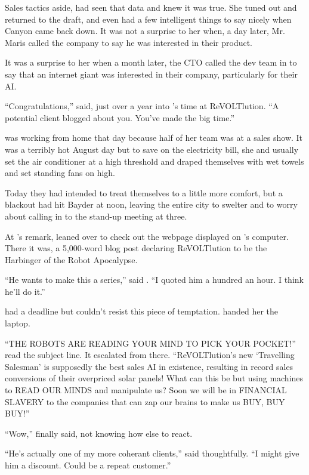 Sales tactics aside, {\protag} had seen that data and knew it was true. She tuned out and returned to the draft, and even had a few intelligent things to say nicely when Canyon came back down. It was not a surprise to her when, a day later, Mr. Maris called the company to say he was interested in their product.

It was a surprise to her when a month later, the CTO called the dev team in to say that an internet giant was interested in their company, particularly for their AI.

\vspace{5mm}

``Congratulations,'' {\sidetag} said, just over a year into {\protag}’s time at ReVOLTlution. ``A potential client blogged about you. You've made the big time.''

{\protag} was working from home that day because half of her team was at a sales show. It was a terribly hot August day but to save on the electricity bill, she and {\sidetag} usually set the air conditioner at a high threshold and draped themselves with wet towels and set standing fans on high.

Today they had intended to treat themselves to a little more comfort, but a blackout had hit Bayder at noon, leaving the entire city to swelter and {\protag} to worry about calling in to the stand-up meeting at three.

At {\sidetag}'s remark, {\protag} leaned over to check out the webpage displayed on {\sidetag}'s computer. There it was, a 5,000-word blog post declaring ReVOLTlution to be the Harbinger of the Robot Apocalypse.

``He wants to make this a series,'' said {\sidetag}. ``I quoted him a hundred an hour. I think he'll do it.''

{\protag} had a deadline but couldn't resist this piece of temptation. {\sidetag} handed her the laptop.

``THE ROBOTS ARE READING YOUR MIND TO PICK YOUR POCKET!'' read the subject line. It escalated from there. ``ReVOLTlution's new `Travelling Salesman' is supposedly the best sales AI in existence, resulting in record sales conversions of their overpriced solar panels! What can this be but using machines to READ OUR MINDS and manipulate us? Soon we will be in FINANCIAL SLAVERY to the companies that can zap our brains to make us BUY, BUY BUY!''

``Wow,'' {\protag} finally said, not knowing how else to react.

``He's actually one of my more coherant clients,'' {\sidetag} said thoughtfully. ``I might give him a discount. Could be a repeat customer.''

